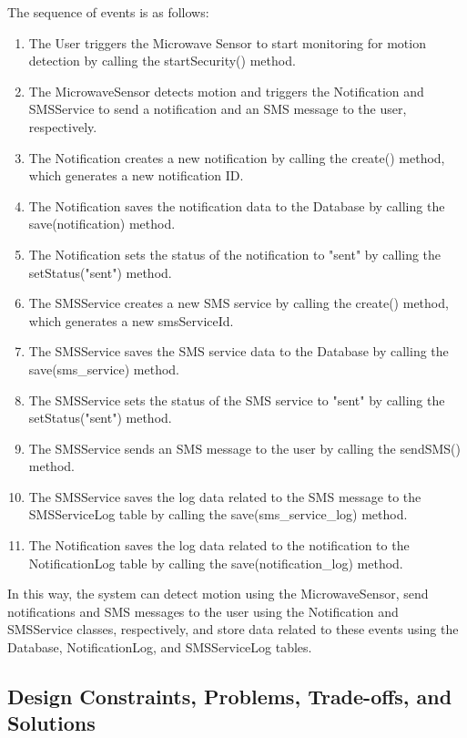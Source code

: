 \documentclass[conference]{IEEEtran}
\begin{document}
The sequence of events is as follows:
\begin{enumerate}
    \item The User triggers the Microwave Sensor to start monitoring for motion detection
          by calling the startSecurity() method.
    \item The MicrowaveSensor detects motion and triggers the Notification and SMSService
          to send a notification and an SMS message to the user, respectively.
    \item The Notification creates a new notification by calling the create() method,
          which generates a new notification ID.
    \item The Notification saves the notification data to the Database by calling the
          save(notification) method.
    \item The Notification sets the status of the notification to "sent" by calling the
          setStatus("sent") method.
    \item The SMSService creates a new SMS service by calling the create() method,
          which generates a new smsServiceId.
    \item The SMSService saves the SMS service data to the Database by calling the
          save(sms\_service) method.
    \item The SMSService sets the status of the SMS service to "sent" by calling the
          setStatus("sent") method.
    \item The SMSService sends an SMS message to the user by calling the sendSMS() method.
    \item The SMSService saves the log data related to the SMS message to the
          SMSServiceLog table by calling the save(sms\_service\_log) method.
    \item The Notification saves the log data related to the notification to the
          NotificationLog table by calling the save(notification\_log) method.
\end{enumerate}

In this way, the system can detect motion using the MicrowaveSensor, send notifications
and SMS messages to the user using the Notification and SMSService classes, respectively,
and store data related to these events using the Database, NotificationLog, and
SMSServiceLog tables.

\subsection{Design Constraints, Problems, Trade-offs, and Solutions}
\end{document}
